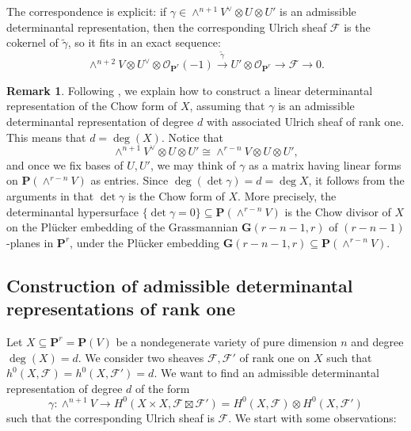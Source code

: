 \documentclass[12pt]{amsart}
\newcounter{thmcounter}
\numberwithin{equation}{section}
\numberwithin{thmcounter}{section}
\theoremstyle{definition}
\newtheorem{remark}[thmcounter]{Remark}
\theoremstyle{claim}
\newcommand{\nP}{\mathbf{P}}
\newcommand{\sF}{\mathscr{F}}
\newcommand{\sO}{\mathscr{O}}
\begin{document}
The correspondence is explicit: if $\gamma \in \wedge^{n+1}V^{\vee} \otimes U\otimes U'$ is an admissible determinantal representation, then the corresponding Ulrich sheaf $\sF$ is the cokernel of $\widetilde{\gamma}$, so it fits in an exact sequence:
\[   \wedge^{n+2}V\otimes U^{\vee} \otimes \sO_{\nP^r}(-1) \xrightarrow{~\widetilde{\gamma}~} U'\otimes \sO_{\nP^r} \longrightarrow \mathscr{F} \longrightarrow 0. \]

\begin{remark}\label{rmk:chowform}
	Following \cite[Remark 4.4]{kummershamovich}, we explain how to construct a linear determinantal representation of the Chow form of $X$, assuming that  $\gamma$ is an admissible determinantal representation of degree $d$ with associated Ulrich sheaf of rank one. This means that $d=\deg(X)$. Notice that
	$$
	\wedge^{n+1} V^{\vee} \otimes U\otimes U' \cong \wedge^{r-n} V \otimes U\otimes U',
	$$
	and once we fix bases of $U,U'$, we may think of $\gamma$ as a matrix having linear forms on $\nP(\wedge^{r-n} V)$ as entries. Since $\deg (\det \gamma)= d = \deg X$, it follows from the arguments in \cite[Remark 4.4]{kummershamovich} that $\det \gamma$ is the Chow form of $X$. More precisely,  the determinantal hypersurface $\{\det \gamma  = 0 \}\subseteq \nP(\wedge^{r-n} V)$ is the Chow divisor of $X$ on the Pl\"{u}cker embedding of the Grassmannian  $\mathbf{G}(r-n-1, r)$ of $(r-n-1)$-planes in $\nP^r$, under the Pl\"ucker embedding $\mathbf{G}(r-n-1,r) \subseteq \nP (\wedge^{r-n} V)$.
\end{remark}

\subsection{Construction of admissible determinantal representations of rank one}

Let $X\subseteq \nP^r = \nP(V)$ be a nondegenerate variety of pure dimension $n$ and degree $\deg(X)=d$. We consider two sheaves $\sF,\sF'$ of rank one on $X$ such that $h^0(X,\sF) = h^0(X,\sF') = d$. We want to find an admissible determinantal representation of degree $d$ of the form
\[ \gamma\colon \wedge^{n+1}V \longrightarrow H^0(X\times X, \sF\boxtimes \sF') = H^0(X,\sF) \otimes H^0(X,\sF') \]
such that the corresponding Ulrich sheaf is $\sF$.
We start with some observations:
\end{document}
